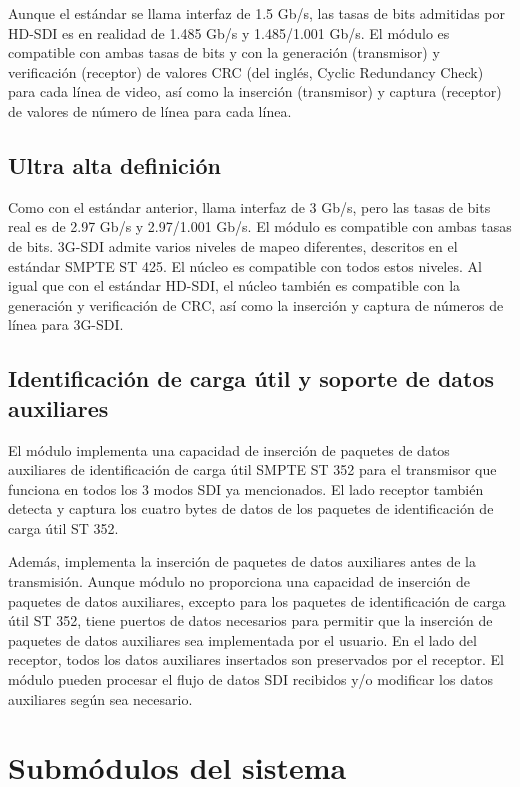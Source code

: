 Aunque el estándar se llama interfaz de 1.5 Gb/s, las tasas de bits admitidas
por HD-SDI es en realidad de 1.485 Gb/s y 1.485/1.001 Gb/s. El módulo es
compatible con ambas tasas de bits y con la generación (transmisor) y
verificación (receptor) de valores CRC (del inglés, Cyclic Redundancy Check)
para cada línea de video, así como la inserción (transmisor) y captura (receptor)
de valores de número de línea para cada línea.

\subsection{Ultra alta definición}

Como con el estándar anterior, llama interfaz de 3 Gb/s, pero las tasas de bits
real es de 2.97 Gb/s y 2.97/1.001 Gb/s. El módulo es compatible con ambas tasas
de bits. 3G-SDI admite varios niveles de mapeo diferentes, descritos en el
estándar SMPTE ST 425. El núcleo es compatible con todos estos niveles. Al
igual que con el estándar HD-SDI, el núcleo también es compatible con la
generación y verificación de CRC, así como la inserción y captura de números de
línea para 3G-SDI\@.

\subsection{Identificación de carga útil y soporte de datos auxiliares}

El módulo implementa una capacidad de inserción de paquetes de datos auxiliares
de identificación de carga útil SMPTE ST 352 para el transmisor que funciona en
todos los 3 modos SDI ya mencionados. El lado receptor también detecta y captura
los cuatro bytes de datos de los paquetes de identificación de carga útil ST 352.

Además, implementa la inserción de paquetes de datos auxiliares antes de la
transmisión. Aunque módulo no proporciona una capacidad de inserción de paquetes
de datos auxiliares, excepto para los paquetes de identificación de carga útil
ST 352, tiene puertos de datos necesarios para permitir que la inserción de
paquetes de datos auxiliares sea implementada por el usuario. En el lado del
receptor, todos los datos auxiliares insertados son preservados por el receptor.
El módulo pueden procesar el flujo de datos SDI recibidos y/o modificar los datos
auxiliares según sea necesario.

\section{Submódulos del sistema}

